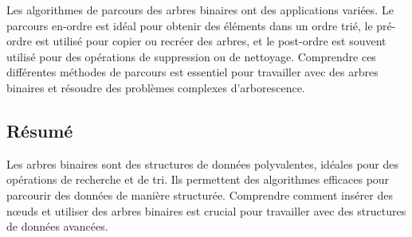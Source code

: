 Les algorithmes de parcours des arbres binaires ont des applications variées. Le parcours en-ordre est idéal pour obtenir des éléments dans un ordre trié, le pré-ordre est utilisé pour copier ou recréer des arbres, et le post-ordre est souvent utilisé pour des opérations de suppression ou de nettoyage. Comprendre ces différentes méthodes de parcours est essentiel pour travailler avec des arbres binaires et résoudre des problèmes complexes d'arborescence.


\subsection{Résumé}
Les arbres binaires sont des structures de données polyvalentes, idéales pour des opérations de recherche et de tri. Ils permettent des algorithmes efficaces pour parcourir des données de manière structurée. Comprendre comment insérer des nœuds et utiliser des arbres binaires est crucial pour travailler avec des structures de données avancées.

